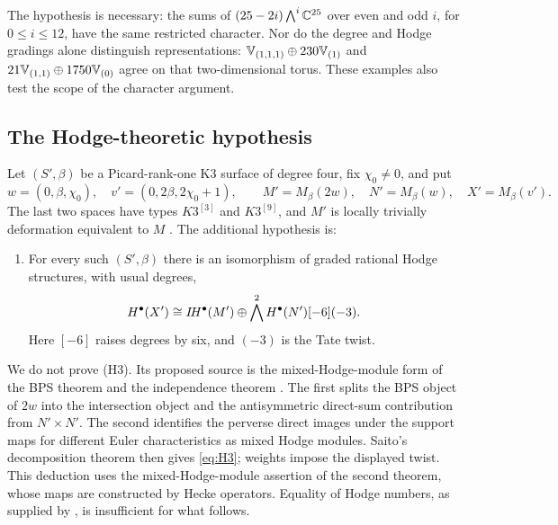 The hypothesis is necessary: the sums of
$(25-2i)\bigwedge^i\mathbb C^{25}$ over even and odd $i$, for
$0\le i\le12$, have the same restricted character. Nor do
the degree and Hodge gradings alone distinguish representations:
$\mathbb V_{(1,1,1)}\oplus230\mathbb V_{(1)}$ and
$21\mathbb V_{(1,1)}\oplus1750\mathbb V_{(0)}$ agree on that
two-dimensional torus. These examples also test the scope
of the character argument.

\subsection{The Hodge-theoretic hypothesis}
Let $(S',\beta)$ be a Picard-rank-one K3 surface of degree four,
fix $\chi_0\ne0$, and put
\[
 w=(0,\beta,\chi_0),\quad v'=(0,2\beta,2\chi_0+1),\qquad
 M'=M_\beta(2w),\quad N'=M_\beta(w),\quad X'=M_\beta(v').
\]
The last two spaces have types $K3^{[3]}$ and $K3^{[9]}$,
and $M'$ is locally trivially deformation equivalent to $M$
\cite[Theorem~1.7]{pr23}. The additional hypothesis is:
\begin{enumerate}
\item[(H3)] For every such $(S',\beta)$ there is an isomorphism
of graded rational Hodge structures, with usual degrees,
\begin{equation}\label{eq:H3}
 H^\bullet(X')\cong I\!H^\bullet(M')\oplus
                 \bigwedge^2H^\bullet(N')[-6](-3).
\end{equation}
Here $[-6]$ raises degrees by six, and $(-3)$ is the Tate twist.
\end{enumerate}
We do not prove (H3). Its proposed source is the mixed-Hodge-module
form of the BPS theorem
\cite[Theorems~9.2 and~10.1, Corollary~3.6,
Propositions~6.10 and~B.14]{dhsm22} and the independence theorem
\cite[Theorem~5.1]{dhksv26}. The first splits the BPS object
of $2w$ into the intersection object and the antisymmetric
direct-sum contribution from $N'\times N'$. The second
identifies the perverse direct images under the support maps
for different Euler characteristics as mixed Hodge modules.
Saito's decomposition theorem \cite[(4.5.4)]{saito90} then
gives \eqref{eq:H3}; weights impose the displayed twist.
This deduction uses the mixed-Hodge-module assertion of the
second theorem, whose maps are constructed by Hecke operators.
Equality of Hodge numbers, as supplied by \cite{gwz26}, is
insufficient for what follows.

